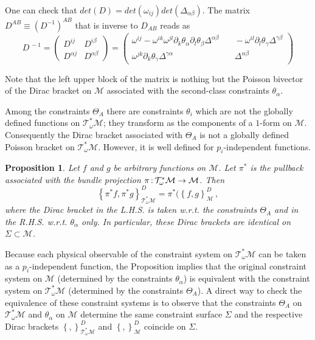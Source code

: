 \documentclass[a4paper,11pt]{amsart}
\newtheorem{prop}[thm]{Proposition}
\numberwithin{thm}{section} %
\numberwithin{equation}{section} %
\numberwithin{figure}{section} %
\newcommand{\pb}[2]{\left\{{}#1{},{}#2{}\right\}}
\renewcommand{\:}{{\rm\, :\,}}
\def\d{\partial}
\def\mod{{\mathcal T}^*_\omega}
\def\manM{{\mathcal M}}
\begin{document}
\noindent
One can check that
$det(D)=det(\omega_{ij})det(\Delta_{\alpha \beta})$.
The matrix $D^{AB}\equiv(D^{-1})^{AB}$ that is inverse to $D_{AB}$ reads as
\vspace{0.3cm}
\begin{equation}
D^{\,-1}= 
\left(\begin{array}{cc}
D^{ij} & D^{i\beta}\\[7pt]
D^{\alpha j}& D^{\alpha\beta}
 \end{array}\right)=
\left(
\begin{array}{cc}
\omega^{ij}-\omega^{ik}\omega^{jl} \d_k \theta_\alpha \d_l
\theta_\beta \Delta^{\alpha\beta} &\quad  - \omega^{il}\d_l \theta_\gamma
\Delta^{\gamma \beta }\\[11pt]
\omega^{jk} \d_k \theta_\gamma \Delta^{\gamma \alpha }& \quad
\Delta^{\alpha \beta}
\end{array}\right)
\end{equation}

\vspace{0.3cm}

\noindent
Note that the left upper block of the matrix is nothing but the
Poisson bivector of the Dirac bracket on $\manM$ associated with
the second-class constraints $\theta_\alpha$.


Among the constraints $\Theta_A$ there are constraints
$\theta_i$ which are not the globally defined functions on $\mod\manM$;
they transform as the components of a $1$-form on $\manM$.
Consequently the Dirac bracket associated with $\Theta_A$
is not a globally defined Poisson bracket on $\mod\manM$.
However, it is well defined for $p_i$-independent functions.
\begin{prop} Let $f$ and $g$ be arbitrary functions on $\manM$.
Let $\pi^*$ is the  pullback associated with the bundle projection
$\pi \: \mod\manM\to  \manM$. Then
\begin{equation}
  \label{eq:coincidence}
\pb{\pi^* f}{\pi^* g}_{\mod\manM}^{D}=
\pi^*(\pb{f}{g}_{\manM}^D\,,
\end{equation}
where the Dirac bracket in the L.H.S. is taken w.r.t. the
constraints $\Theta_A$ and in the R.H.S. w.r.t. $\theta_\alpha$
only. In particular, these Dirac brackets are identical on $\Sigma \subset 
\manM$.
\end{prop}
Because each physical observable of the constraint system on
$\mod\manM$ can be taken as a $p_i$-independent function, the Proposition
implies that the original constraint system on $\manM$ (determined by
the constraints $\theta_\alpha$) is equivalent with the constraint
system on $\mod\manM$ (determined by the constraints $\Theta_A$).
A direct way to check the equivalence of these constraint systems is to
observe that the constraints $\Theta_A$ on $\mod\manM$  and $\theta_\alpha$
on $\manM$ determine the same constraint surface $\Sigma$ and
the respective Dirac brackets $\pb{}{}_{\mod\manM}^{D}$ and
$\pb{}{}_{\manM}^D$ coincide on $\Sigma$.
\end{document}
